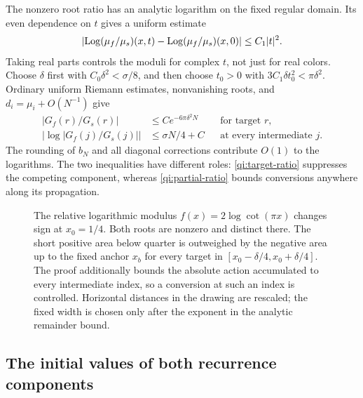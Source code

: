 The nonzero root ratio has an analytic logarithm on the fixed regular domain. Its even dependence on $t$ gives a uniform estimate
\begin{equation}\label{qi:color-continuity}
 \left|\operatorname{Log}(\mu_f/\mu_s)(x,t)
       -\operatorname{Log}(\mu_f/\mu_s)(x,0)\right|\le C_1|t|^2.
\end{equation}
Taking real parts controls the moduli for complex $t$, not just for real colors. Choose $\delta$ first with
$C_0\delta^2<\sigma/8$, and then choose $t_0>0$ with
$3C_1\delta t_0^2<\pi\delta^2$. Ordinary uniform Riemann estimates, nonvanishing roots, and $d_i=\mu_i+O(N^{-1})$ give
\begin{align}
 |G_f(r)/G_s(r)|&\le C e^{-6\pi\delta^2N}
             &&\text{for target }r,\label{qi:target-ratio}\\
 \left|\log|G_f(j)/G_s(j)|\right|&\le \sigma N/4+C
             &&\text{at every intermediate }j.\label{qi:partial-ratio}
\end{align}
The rounding of $b_N$ and all diagonal corrections contribute $O(1)$ to the logarithms. The two inequalities have different roles: \eqref{qi:target-ratio} suppresses the competing component, whereas \eqref{qi:partial-ratio} bounds conversions anywhere along its propagation.

\begin{figure}[ht]
 \centering
 \caption{The relative logarithmic modulus $f(x)=2\log\cot(\pi x)$ changes sign at $x_0=1/4$. Both roots are nonzero and distinct there. The short positive area below quarter is outweighed by the negative area up to the fixed anchor $x_b$ for every target in $[x_0-\delta/4,x_0+\delta/4]$. The proof additionally bounds the absolute action accumulated to every intermediate index, so a conversion at such an index is controlled. Horizontal distances in the drawing are rescaled; the fixed width is chosen only after the exponent in the analytic remainder bound.}\label{qi:action-figure}
\end{figure}

\subsection{The initial values of both recurrence components}

